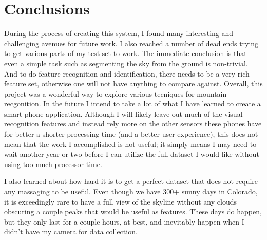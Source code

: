 \documentclass{acm_proc_article-sp}
\begin{document}
\section{Conclusions}
During the process of creating this system, I found many interesting and challenging avenues for future work.  I also reached a number of dead ends trying to get various parts of my test set to work.  The immediate conclusion is that even a simple task such as segmenting the sky from the ground is non-trivial.  And to do feature recognition and identification, there needs to be a very rich feature set, otherwise one will not have anything to compare against.  Overall, this project was a wonderful way to explore various tecniques for mountain recgonition.  In the future I intend to take a lot of what I have learned to create a smart phone application.  Although I will likely leave out much of the visual recognition features and instead rely more on the other sensors these phones have for better a shorter processing time (and a better user experience), this does not mean that the work I accomplished is not useful; it simply means I may need to wait another year or two before I can utilize the full dataset I would like without using too much processor time.

I also learned about how hard it is to get a perfect dataset that does not require any massaging to be useful.  Even though we have 300+ sunny days in Colorado, it is exceedingly rare to have a full view of the skyline without any clouds obscuring a couple peaks that would be useful as features.  These days do happen, but they only last for a couple hours, at best, and inevitably happen when I didn't have my camera for data collection.



\end{document}
